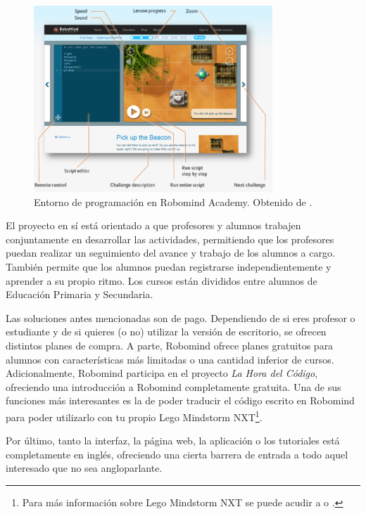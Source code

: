 \begin{figure}[!ht]
	\begin{centering}
		\includegraphics[width=0.8\textwidth]{images/robomind-entorno.png}
			\caption{Entorno de programación en Robomind Academy. Obtenido de \cite{robomind-web}.}
				\label{fig:robomind-entorno}
	\end{centering}
\end{figure}


El proyecto en sí está orientado a que profesores y alumnos trabajen conjuntamente en desarrollar las actividades, permitiendo que los profesores puedan realizar un seguimiento del avance y trabajo de los alumnos a cargo. También permite que los alumnos puedan registrarse independientemente y aprender a su propio ritmo. Los cursos están divididos entre alumnos de Educación Primaria y Secundaria. 

Las soluciones antes mencionadas son {\color{red}de pago}. Dependiendo de si eres profesor o estudiante y de si quieres (o no) utilizar la versión de escritorio, se ofrecen distintos planes de compra. 
A parte, Robomind ofrece planes gratuitos para alumnos con características más limitadas o una cantidad inferior de cursos. Adicionalmente, Robomind participa en el proyecto \emph{La Hora del Código}\cite{hour-of-code}, ofreciendo una introducción a Robomind completamente gratuita. Una de sus funciones más interesantes es la de poder traducir el código escrito en Robomind para poder utilizarlo con tu propio Lego Mindstorm NXT\footnote{Para más información sobre Lego Mindstorm NXT se puede acudir a \cite{lego-mindstorm} o \cite{lego-mindstorm-programar}.}.

Por último, tanto la interfaz, la página web, la aplicación o los tutoriales está completamente en inglés, ofreciendo una cierta barrera de entrada a todo aquel interesado que no sea angloparlante. 

